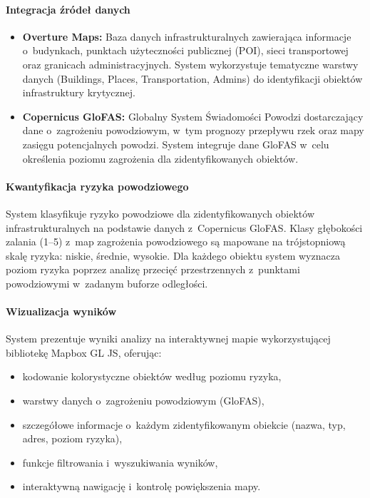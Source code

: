 \paragraph{Integracja źródeł danych}
\begin{itemize}
    \item \textbf{Overture Maps:} Baza danych infrastrukturalnych zawierająca informacje o~budynkach, punktach użyteczności publicznej (POI), sieci transportowej oraz granicach administracyjnych. System wykorzystuje tematyczne warstwy danych (Buildings, Places, Transportation, Admins) do identyfikacji obiektów infrastruktury krytycznej.

    \item \textbf{Copernicus GloFAS:} Globalny System Świadomości Powodzi dostarczający dane o~zagrożeniu powodziowym, w~tym prognozy przepływu rzek oraz mapy zasięgu potencjalnych powodzi. System integruje dane GloFAS w~celu określenia poziomu zagrożenia dla zidentyfikowanych obiektów.
\end{itemize}

\paragraph{Kwantyfikacja ryzyka powodziowego}
System klasyfikuje ryzyko powodziowe dla zidentyfikowanych obiektów infrastrukturalnych na podstawie danych z~Copernicus GloFAS. Klasy głębokości zalania (1--5) z~map zagrożenia powodziowego są mapowane na trójstopniową skalę ryzyka: niskie, średnie, wysokie. Dla każdego obiektu system wyznacza poziom ryzyka poprzez analizę przecięć przestrzennych z~punktami powodziowymi w~zadanym buforze odległości.

\paragraph{Wizualizacja wyników}
System prezentuje wyniki analizy na interaktywnej mapie wykorzystującej bibliotekę Mapbox GL JS, oferując:
\begin{itemize}
    \item kodowanie kolorystyczne obiektów według poziomu ryzyka,
    \item warstwy danych o~zagrożeniu powodziowym (GloFAS),
    \item szczegółowe informacje o~każdym zidentyfikowanym obiekcie (nazwa, typ, adres, poziom ryzyka),
    \item funkcje filtrowania i~wyszukiwania wyników,
    \item interaktywną nawigację i~kontrolę powiększenia mapy.
\end{itemize}


